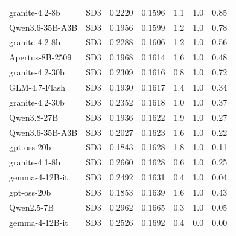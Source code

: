 \begin{tabular}{llrrrrr}
granite-4.2-8b & SD3 & 0.2220 & 0.1596 & 1.1 & 1.0 & 0.85\\
Qwen3.6-35B-A3B & SD3 & 0.1956 & 0.1599 & 1.2 & 1.0 & 0.78\\
granite-4.2-8b & SD3 & 0.2288 & 0.1606 & 1.2 & 1.0 & 0.56\\
Apertus-8B-2509 & SD3 & 0.1968 & 0.1614 & 1.6 & 1.0 & 0.48\\
granite-4.2-30b & SD3 & 0.2309 & 0.1616 & 0.8 & 1.0 & 0.72\\
GLM-4.7-Flash & SD3 & 0.1930 & 0.1617 & 1.4 & 1.0 & 0.34\\
granite-4.2-30b & SD3 & 0.2352 & 0.1618 & 1.0 & 1.0 & 0.37\\
Qwen3.8-27B & SD3 & 0.1936 & 0.1622 & 1.9 & 1.0 & 0.27\\
Qwen3.6-35B-A3B & SD3 & 0.2027 & 0.1623 & 1.6 & 1.0 & 0.22\\
gpt-oss-20b & SD3 & 0.1843 & 0.1628 & 1.8 & 1.0 & 0.11\\
granite-4.1-8b & SD3 & 0.2660 & 0.1628 & 0.6 & 1.0 & 0.25\\
gemma-4-12B-it & SD3 & 0.2492 & 0.1631 & 0.4 & 1.0 & 0.04\\
gpt-oss-20b & SD3 & 0.1853 & 0.1639 & 1.6 & 1.0 & 0.43\\
Qwen2.5-7B & SD3 & 0.2962 & 0.1665 & 0.3 & 1.0 & 0.05\\
gemma-4-12B-it & SD3 & 0.2526 & 0.1692 & 0.4 & 0.0 & 0.00\\
\bottomrule
\end{tabular}